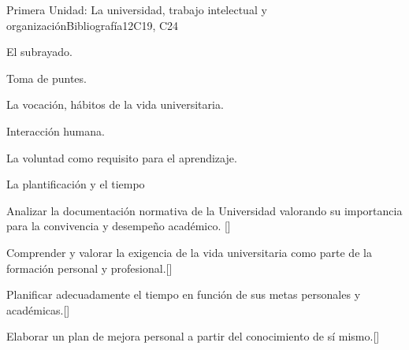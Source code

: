 \begin{syllabus}
\begin{unit}{}{Primera Unidad: La universidad, trabajo intelectual y organización}{Bibliografía}{12}{C19, C24}
\begin{topics}
        \item El subrayado.
        \item Toma de puntes.
        \item La vocación, hábitos de la vida universitaria.
        \item Interacción humana.
        \item La voluntad como requisito para el aprendizaje.
        \item La plantificación y el tiempo
\end{topics}
\begin{learningoutcomes}
        \item Analizar la documentación normativa de la Universidad valorando su importancia para la  convivencia y desempeño académico. [\Usage]
        \item Comprender y valorar la exigencia de la vida universitaria como parte de la formación personal y profesional.[\Usage]
        \item Planificar adecuadamente el tiempo  en función de sus metas personales y académicas.[\Usage]
        \item Elaborar un plan de mejora personal a partir del conocimiento de sí mismo.[\Usage]
\end{learningoutcomes}
\end{unit}


\end{syllabus}
